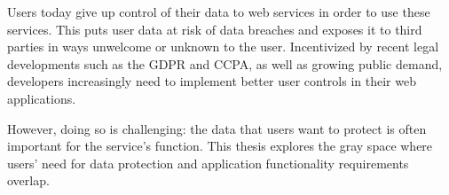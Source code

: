 Users today give up control of their data to web services in order to use these
services. This puts user data at risk of data breaches and exposes it to third
parties in ways unwelcome or unknown to the user.
%
Incentivized by recent legal developments such as the GDPR and CCPA, as well as growing
public demand, developers increasingly need to implement better user controls in
their web applications.

However, doing so is challenging: the data that users want to protect is often
important for the service's function.
%
This thesis explores the gray space where users’ need for data protection and
application functionality requirements overlap. 
